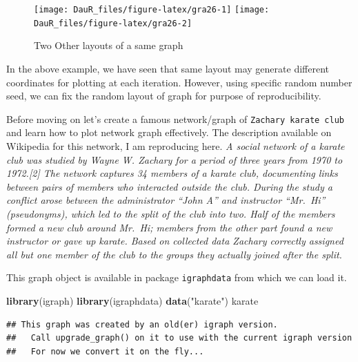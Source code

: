 \documentclass[
]{book}
\newenvironment{Shaded}{\begin{snugshade}}{\end{snugshade}}
\newcommand{\FunctionTok}[1]{\textcolor[rgb]{0.13,0.29,0.53}{\textbf{#1}}}
\newcommand{\NormalTok}[1]{#1}
\newcommand{\StringTok}[1]{\textcolor[rgb]{0.31,0.60,0.02}{#1}}
\begin{document}
\begin{figure}

{\centering \texttt{[image: DauR\_files/figure-latex/gra26-1]} \texttt{[image: DauR\_files/figure-latex/gra26-2]} 

}

\caption{Two Other layouts of a same graph}\label{fig:gra26}
\end{figure}

In the above example, we have seen that same layout may generate different coordinates for plotting at each iteration. However, using specific random number seed, we can fix the random layout of graph for purpose of reproducibility.

Before moving on let's create a famous network/graph of \texttt{Zachary\ karate\ club} and learn how to plot network graph effectively. The description available on Wikipedia for this network, I am reproducing here. \emph{A social network of a karate club was studied by Wayne W. Zachary for a period of three years from 1970 to 1972.{[}2{]} The network captures 34 members of a karate club, documenting links between pairs of members who interacted outside the club. During the study a conflict arose between the administrator ``John A'' and instructor ``Mr.~Hi'' (pseudonyms), which led to the split of the club into two. Half of the members formed a new club around Mr.~Hi; members from the other part found a new instructor or gave up karate. Based on collected data Zachary correctly assigned all but one member of the club to the groups they actually joined after the split.}

This graph object is available in package \texttt{igraphdata} from which we can load it.

\begin{Shaded}
\begin{Highlighting}[]
\FunctionTok{library}\NormalTok{(igraph)}
\FunctionTok{library}\NormalTok{(igraphdata)}
\FunctionTok{data}\NormalTok{(}\StringTok{"karate"}\NormalTok{)}
\NormalTok{karate}
\end{Highlighting}
\end{Shaded}

\begin{verbatim}
## This graph was created by an old(er) igraph version.
##   Call upgrade_graph() on it to use with the current igraph version
##   For now we convert it on the fly...
\end{verbatim}
\end{document}
